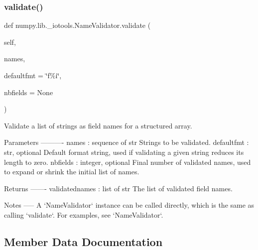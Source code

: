 \mbox{\label{classnumpy_1_1lib_1_1__iotools_1_1NameValidator_a4c6df4cd621243673cfc0d48569ff4c5}} 
\subsubsection{\texorpdfstring{validate()}{validate()}}
{\footnotesize\ttfamily def numpy.\+lib.\+\_\+iotools.\+Name\+Validator.\+validate (\begin{DoxyParamCaption}\item[{}]{self,  }\item[{}]{names,  }\item[{}]{defaultfmt = {\ttfamily \char`\"{}f\%i\char`\"{}},  }\item[{}]{nbfields = {\ttfamily None} }\end{DoxyParamCaption})}

\begin{DoxyVerb}Validate a list of strings as field names for a structured array.

Parameters
----------
names : sequence of str
    Strings to be validated.
defaultfmt : str, optional
    Default format string, used if validating a given string
    reduces its length to zero.
nbfields : integer, optional
    Final number of validated names, used to expand or shrink the
    initial list of names.

Returns
-------
validatednames : list of str
    The list of validated field names.

Notes
-----
A `NameValidator` instance can be called directly, which is the
same as calling `validate`. For examples, see `NameValidator`.\end{DoxyVerb}
 

\subsection{Member Data Documentation}
\mbox{\label{classnumpy_1_1lib_1_1__iotools_1_1NameValidator_a2681b70582c336b3a67095923bac684d}} 
